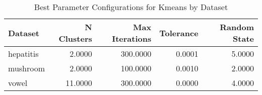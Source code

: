 \begin{table*}[ht!]
\caption{Best Parameter Configurations for Kmeans by Dataset}
\label{tab:best_configs_kmeans_config}
\begin{tabular}{lrrrr}
Dataset & N Clusters & Max Iterations & Tolerance & Random State \\\midrule

hepatitis & 2.0000 & 300.0000 & 0.0001 & 5.0000 \\
mushroom & 2.0000 & 100.0000 & 0.0010 & 2.0000 \\
vowel & 11.0000 & 300.0000 & 0.0000 & 4.0000 \\
\end{tabular}
\end{table*}
